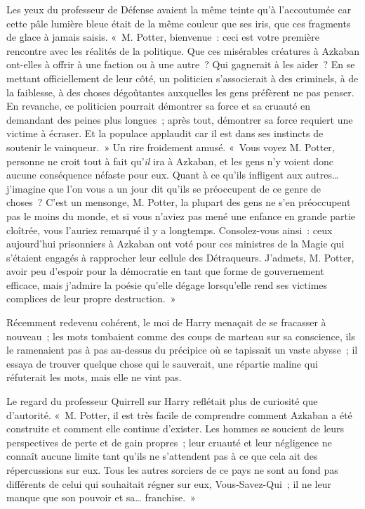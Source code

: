 Les yeux du professeur de Défense avaient la même teinte qu'à l'accoutumée car cette pâle lumière bleue était de la même couleur que ses iris, que ces fragments de glace à jamais saisis.
«~M. Potter, bienvenue~: ceci est votre première rencontre avec les réalités de la politique.
Que ces misérables créatures à Azkaban ont-elles à offrir à une faction ou à une autre~?
Qui gagnerait à les aider~?
En se mettant officiellement de leur côté, un politicien s'associerait à des criminels, à de la faiblesse, à des choses dégoûtantes auxquelles les gens préfèrent ne pas penser.
En revanche, ce politicien pourrait démontrer sa force et sa cruauté en demandant des peines plus longues~; après tout, démontrer sa force requiert une victime à écraser.
Et la populace applaudit car il est dans ses instincts de soutenir le vainqueur.~»
Un rire froidement amusé.
«~Vous voyez M. Potter, personne ne croit tout à fait qu'\emph{il} ira à Azkaban, et les gens n'y voient donc aucune conséquence néfaste pour eux.
Quant à ce qu'ils infligent aux autres… j'imagine que l'on vous a un jour dit qu'ils se préoccupent de ce genre de choses~?
C'est un mensonge, M. Potter, la plupart des gens ne s'en préoccupent pas le moins du monde, et si vous n'aviez pas mené une enfance en grande partie cloîtrée, vous l'auriez remarqué il y a longtemps.
Consolez-vous ainsi~: ceux aujourd'hui prisonniers à Azkaban ont voté pour ces ministres de la Magie qui s'étaient engagés à rapprocher leur cellule des Détraqueurs.
J'admets, M. Potter, avoir peu d'espoir pour la démocratie en tant que forme de gouvernement efficace, mais j'admire la poésie qu'elle dégage lorsqu'elle rend ses victimes complices de leur propre destruction.~»

Récemment redevenu cohérent, le moi de Harry menaçait de se fracasser à nouveau~; les mots tombaient comme des coups de marteau sur sa conscience, ils le ramenaient pas à pas au-dessus du précipice où se tapissait un vaste abysse~; il essaya de trouver quelque chose qui le sauverait, une répartie maline qui réfuterait les mots, mais elle ne vint pas.

Le regard du professeur Quirrell sur Harry reflétait plus de curiosité que d'autorité.
«~M. Potter, il est très facile de comprendre comment Azkaban a été construite et comment elle continue d'exister.
Les hommes se soucient de leurs perspectives de perte et de gain propres~; leur cruauté et leur négligence ne connaît aucune limite tant qu'ils ne s'attendent pas à ce que cela ait des répercussions sur eux.
Tous les autres sorciers de ce pays ne sont au fond pas différents de celui qui souhaitait régner sur eux, Vous-Savez-Qui~; il ne leur manque que son pouvoir et sa… franchise.~»

